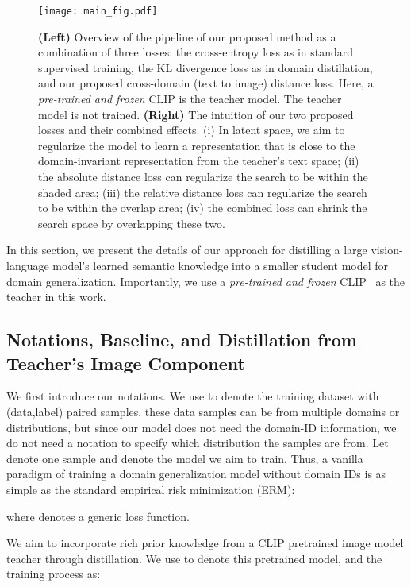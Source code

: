 \documentclass[10pt,twocolumn,letterpaper]{article}
\begin{document}
\begin{figure*}[t]
\centering
\texttt{[image: main\_fig.pdf]}
\caption{\textbf{(Left)} Overview of the pipeline of our proposed method
as a combination of three losses: the cross-entropy loss as in standard supervised training, the KL divergence loss as in domain distillation, and our proposed cross-domain (text to image) distance loss. Here, a \emph{pre-trained and frozen} CLIP is the teacher model.  The teacher model is not trained.
\textbf{(Right)} The intuition of our two proposed losses and their combined effects. (i) In latent space, 
we aim to regularize the model to learn a representation that is close to the domain-invariant representation from the teacher's text space; (ii) the absolute distance loss can regularize the search to be within the shaded area; (iii) the relative distance loss can regularize the search to be within the overlap area; (iv) the combined loss can shrink the search space by overlapping these two. }
\label{fig:main}
\end{figure*}


In this section, we present the details of our approach for distilling a large vision-language model's learned semantic knowledge into a smaller student model for domain generalization.  Importantly, we use a \emph{pre-trained and frozen} CLIP~\cite{radford2021learning} as the teacher in this work.

\subsection{Notations, Baseline, and Distillation from Teacher's Image Component}

We first introduce our notations. 
We use  to denote the training dataset with  (data,label) paired samples. 
these data samples can be from multiple domains or distributions, 
but 
since our model does not need the domain-ID information, 
we do not need a notation to specify which distribution the samples are from. 
Let  denote one sample and  denote the model we aim to train.  Thus, a vanilla paradigm of training a domain generalization 
model without domain IDs is as simple as the standard empirical risk minimization (ERM):

where  denotes a generic loss function. 

We aim to incorporate rich prior knowledge from a CLIP pretrained image model teacher
through distillation. 
We use  to denote this pretrained model, 
and the training process as:
\end{document}
